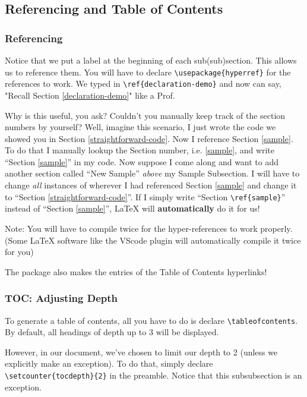 \documentclass{article}
\begin{document}
\subsection{Referencing and Table of Contents}
\label{ref-toc}


\subsubsection{Referencing}
Notice that we put a label at the beginning of each sub(sub)section. This allows us to reference them. You will have to declare \verb!\usepackage{hyperref}! for the references to work. We typed in \verb!\ref{declaration-demo}! and now can say, "Recall Section \ref{declaration-demo}" like a Prof.

Why is this useful, you ask? Couldn't you manually keep track of the section numbers by yourself? Well, imagine this scenario, I just wrote the code we showed you in Section \ref{straightforward-code}. Now I reference Section \ref{sample}. To do that I manually lookup the Section number, i.e. \ref{sample}, and write ``Section \ref{sample}'' in my code. Now suppose I come along and want to add another section called ``New Sample'' \textit{above} my Sample Subsection. I will have to change \textit{all} instances of wherever I had referenced Section \ref{sample} and change it to ``Section \ref{straightforward-code}''. If I simply write ``Section \verb!\ref{sample}!'' instead of ``Section \ref{sample}'', \LaTeX{} will \textbf{automatically} do it for us!

Note: You will have to compile twice for the hyper-references to work properly. (Some \LaTeX{} software like the VScode plugin will automatically compile it twice for you)

The package also makes the entries of the Table of Contents hyperlinks!

{\setcounter{tocdepth}{3}}
\subsubsection{TOC: Adjusting Depth}
To generate a table of contents, all you have to do is declare \verb!\tableofcontents!. By default, all headings of depth up to 3 will be displayed. 

However, in our document, we've chosen to limit our depth to 2 (unless we explicitly make an exception). To do that, simply declare \verb!\setcounter{tocdepth}{2}! in the preamble. Notice that this subsubsection is an exception. 
\end{document}
